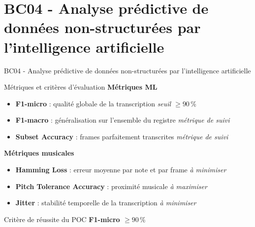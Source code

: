 \section{BC04 - Analyse prédictive de données non-structurées par l'intelligence artificielle}

\begin{frame}
    \centering
    \huge
    BC04 - Analyse prédictive de données non-structurées par l'intelligence artificielle
\end{frame}

\begin{frame}{Métriques et critères d'évaluation}
	\textbf{Métriques ML}
	\begin{itemize}
		\item \textbf{F1-micro} : qualité globale de la transcription
		\hfill \textit{seuil $\geq 90\,\%$}
		
		\item \textbf{F1-macro} : généralisation sur l'ensemble du registre
		\hfill \textit{métrique de suivi}
		
		\item \textbf{Subset Accuracy} : frames parfaitement transcrites
		\hfill \textit{métrique de suivi}
	\end{itemize}
	
	\vspace{0.2cm}
	
	\textbf{Métriques musicales}
	\begin{itemize}
		\item \textbf{Hamming Loss} : erreur moyenne par note et par frame
		\hfill \textit{à minimiser}
		
		\item \textbf{Pitch Tolerance Accuracy} : proximité musicale
		\hfill \textit{à maximiser}
		
		\item \textbf{Jitter} : stabilité temporelle de la transcription
		\hfill \textit{à minimiser}
	\end{itemize}
	
	\vspace{0.2cm}
	
	\begin{block}{Critère de réussite du POC}
		\centering
		\textbf{F1-micro $\geq 90\,\%$}
	\end{block}
\end{frame}

